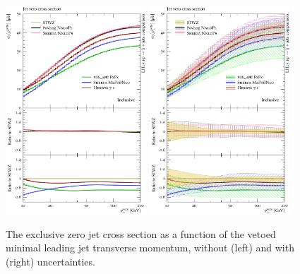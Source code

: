 \begin{figure}[t!]
  \centering
  \includegraphics[width=0.47\textwidth]{figures/hjetscomp_u_xs_jet_veto_j0.pdf}
  \hfill
  \includegraphics[width=0.47\textwidth]{figures/hjetscomp_xs_jet_veto_j0.pdf}
  \caption{
    The exclusive zero jet cross section as a function of 
    the vetoed minimal leading jet transverse momentum,
    without (left) and with (right) uncertainties.
    \label{fig:hjetscomp:results:jvobs:jvxs0}
  }
\end{figure}

